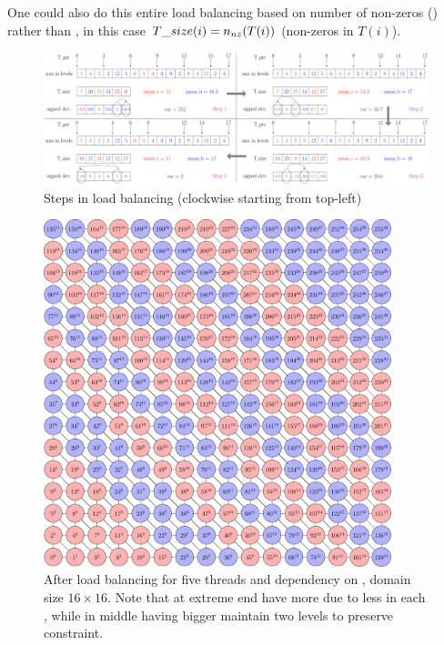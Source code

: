   One could also do this entire load balancing based on number of non-zeros (\nnz) rather than \nrows, in this case $T\_size(i)=n_{nz}(T(i))$ (non-zeros in $T(i)$).
  
   \begin{figure}[tbhp]
   	\centering
   	\includegraphics[height=0.22\textheight,width=\textwidth]{pics/load_balancing/lb_alg/lb_all}
   	\caption{Steps in load balancing (clockwise starting from top-left)}
   	\label{fig:lb_alg}
   \end{figure}
   
    
    \begin{figure}
      \begin{minipage}[c]{0.63\textwidth}
      	\includegraphics[height=0.26\textheight,width=0.9\textwidth]{pics/load_balancing/2d-7pt/stencil_2d_7pt}
      \end{minipage}\hfill
      \begin{minipage}[c]{0.34\textwidth}
      	\caption{After load balancing for five threads and \DTWO dependency on \stex, domain size $16 \times 16$. Note that \levelGroups at extreme end have more \levels due to less \nrows in each \level, while \levelGroups in middle having bigger \levels maintain two levels to preserve \DTWO constraint.
      	} \label{fig:2d_7pt_lb}
      \end{minipage}
     \end{figure}
     

